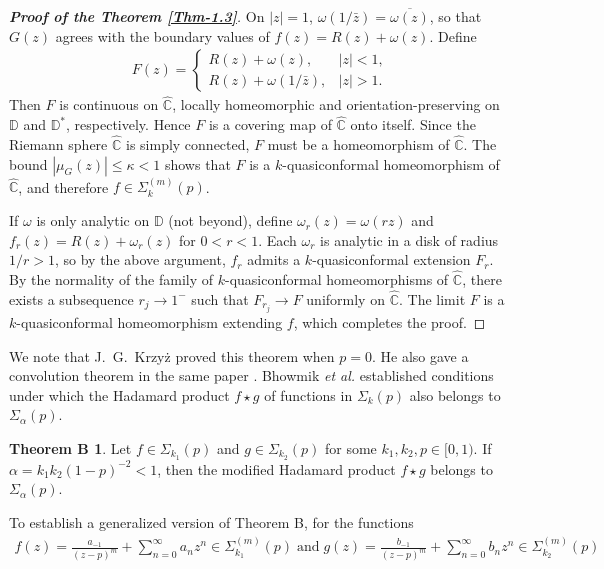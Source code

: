 \documentclass[a4paper,12pt]{amsart}
\theoremstyle{plain}
\theoremstyle{definition}
\newtheorem*{thmB}{Theorem B}
\begin{document}
\begin{proof}[\bf{Proof of the Theorem \ref{Thm-1.3}}]
	On $|z| = 1$, $\omega(1/\bar{z}) = \overline{\omega(z)}$, so that 
	$G(z)$ agrees with the boundary values of $f(z) = R(z) + \omega(z)$. 
	Define
	\begin{align*}
		F(z) =
		\begin{cases}
			R(z) + \omega(z), & |z| < 1,\\[4pt]
			R(z) + \omega(1/\bar{z}), & |z| > 1.
		\end{cases}
	\end{align*}
	Then $F$ is continuous on $\widehat{\mathbb{C}}$, 
	locally homeomorphic and orientation-preserving on $\mathbb{D}$ and $\mathbb{D}^*$, respectively. 
	Hence $F$ is a covering map of $\widehat{\mathbb{C}}$ onto itself.
	Since the Riemann sphere $\widehat{\mathbb{C}}$ is simply connected, 
	$F$ must be a homeomorphism of $\widehat{\mathbb{C}}$. 
	The bound $|\mu_G(z)| \le \kappa < 1$ shows that $F$ is a $k$-quasiconformal homeomorphism of $\widehat{\mathbb{C}}$, 
	and therefore $f \in \Sigma^{(m)}_k(p)$.
	
	If $\omega$ is only analytic on $\mathbb{D}$ (not beyond), 
	define $\omega_r(z) = \omega(rz)$ and $f_r(z) = R(z) + \omega_r(z)$ for $0 < r < 1$. 
	Each $\omega_r$ is analytic in a disk of radius $1/r > 1$, 
	so by the above argument, $f_r$ admits a $k$-quasiconformal extension $F_r$.
	By the normality of the family of $k$-quasiconformal homeomorphisms of $\widehat{\mathbb{C}}$, 
	there exists a subsequence $r_j \to 1^{-}$ such that $F_{r_j} \to F$ uniformly on $\widehat{\mathbb{C}}$. 
	The limit $F$ is a $k$-quasiconformal homeomorphism extending $f$, which completes the proof.
\end{proof}
We note that J.~G.~Krzyż \cite{Krzyż-1976} proved this theorem when $p=0$. 
He also gave a convolution theorem in the same paper \cite{Krzyż-1976}. Bhowmik \emph{et al.} \cite[Theorem 3]{Bhowmik-PAMS-2016} established conditions under which the Hadamard product $f \star g$ of functions in $\Sigma_{k}(p)$ also belongs to $\Sigma_{\alpha}(p)$.
\begin{thmB}\cite[Theorem 3]{Bhowmik-PAMS-2016}
	Let $f \in \Sigma_{k_1}(p)$ and $g \in \Sigma_{k_2}(p)$ for some $k_1, k_2, p \in [0,1)$. 
	If $\alpha = k_1 k_2 (1-p)^{-2} < 1$, then the modified Hadamard product $f \star g$ belongs to $\Sigma_{\alpha}(p)$.
\end{thmB}
\noindent To establish a generalized version of Theorem B, for the functions
\begin{align*}
	f(z)=\frac{a_{-1}}{(z-p)^{m}}+\sum_{n=0}^{\infty}a_n z^n \in \Sigma^{(m)}_{k_1}(p)\; \mbox{and}\;
	g(z)=\frac{b_{-1}}{(z-p)^{m}}+\sum_{n=0}^{\infty}b_n z^n \in \Sigma^{(m)}_{k_2}(p)
\end{align*}
\end{document}
